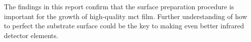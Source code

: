 The findings in this report confirm that the surface preparation procedure is important for the growth of high-quality \ac{mct} film. Further understanding of how to perfect the substrate surface could be the key to making even better infrared detector elements.











